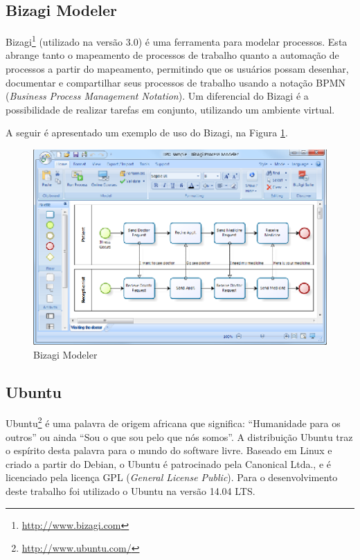 \begin{apendicesenv}
\subsection{Bizagi Modeler}

Bizagi\footnote{\url{http://www.bizagi.com}} (utilizado na versão 3.0) é uma ferramenta para modelar processos. Esta abrange tanto o mapeamento de processos de trabalho quanto a automação de processos a partir do mapeamento, permitindo que os usuários possam desenhar, documentar e compartilhar seus processos de trabalho usando a notação BPMN (\textit{Business Process Management Notation}). Um diferencial do Bizagi é a possibilidade de realizar tarefas em conjunto, utilizando um ambiente virtual.

A seguir é apresentado um exemplo de uso do Bizagi, na Figura \ref{bizagi}.

\begin{figure}[!h]
	\centering
	\includegraphics[scale=1.5]{figuras/capitulo3/bizagi.eps}
	\caption{Bizagi Modeler}
	\label{bizagi}
\end{figure}

\subsection{Ubuntu}

Ubuntu\footnote{\url{http://www.ubuntu.com/}} é uma palavra de origem africana que significa: ``Humanidade para os outros'' ou ainda ``Sou o que sou pelo que nós somos''. A distribuição Ubuntu traz o espírito desta palavra para o mundo do software livre. Baseado em Linux e criado a partir do Debian, o Ubuntu é patrocinado pela Canonical Ltda., e é licenciado pela licença GPL (\textit{General License Public}). Para o desenvolvimento deste trabalho foi utilizado o Ubuntu na versão 14.04 LTS.


\end{apendicesenv}
